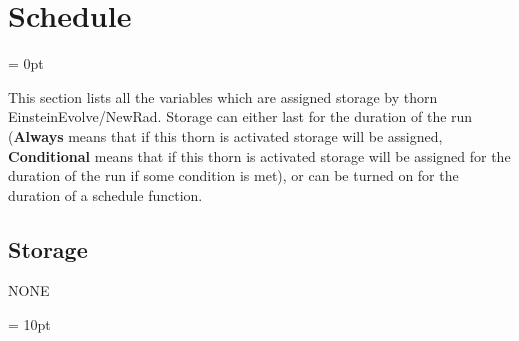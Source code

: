 
\section{Schedule} 


\parskip = 0pt


\noindent This section lists all the variables which are assigned storage by thorn EinsteinEvolve/NewRad.  Storage can either last for the duration of the run ({\bf Always} means that if this thorn is activated storage will be assigned, {\bf Conditional} means that if this thorn is activated storage will be assigned for the duration of the run if some condition is met), or can be turned on for the duration of a schedule function.


\subsection*{Storage}NONE

\vspace{5mm}\parskip = 10pt 
